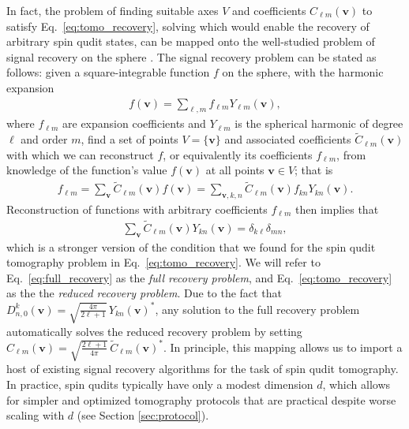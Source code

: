 \documentclass[notitlepage,twocolumn]{revtex4-2}
\newcommand{\p}[1]{\left(#1\right)} %
\renewcommand{\v}{\bm} %
\renewcommand{\set}[1]{\{#1\}} %
\begin{document}
In fact, the problem of finding suitable axes $V$ and coefficients $C_{\ell m}\p{\v v}$ to satisfy Eq.~\eqref{eq:tomo_recovery}, solving which would enable the recovery of arbitrary spin qudit states, can be mapped onto the well-studied problem of signal recovery on the sphere \cite{mcewen2011novel, rauhut2011sparse, alem2012sparse, khalid2014optimaldimensionality}.
The signal recovery problem can be stated as follows: given a square-integrable function $f$ on the sphere, with the harmonic expansion
\begin{align}
  f\p{\v v} = \sum_{\ell,m} f_{\ell m} Y_{\ell m}\p{\v v},
\end{align}
where $f_{\ell m}$ are expansion coefficients and $Y_{\ell m}$ is the spherical harmonic of degree $\ell$ and order $m$, find a set of points $V=\set{\v v}$ and associated coefficients $\tilde C_{\ell m}\p{\v v}$ with which we can reconstruct $f$, or equivalently its coefficients $f_{\ell m}$, from knowledge of the function's value $f\p{\v v}$ at all points $\v v\in V$; that is
\begin{align}
  f_{\ell m} = \sum_{\v v} \tilde C_{\ell m}\p{\v v} f\p{\v v}
  = \sum_{\v v,k,n} \tilde C_{\ell m}\p{\v v} f_{kn} Y_{kn}\p{\v v}.
\end{align}
Reconstruction of functions with arbitrary coefficients $f_{\ell m}$ then implies that
\begin{align}
  \sum_{\v v} \tilde C_{\ell m}\p{\v v} Y_{kn}\p{\v v}
  = \delta_{k\ell} \delta_{mn},
  \label{eq:full_recovery}
\end{align}
which is a stronger version of the condition that we found for the spin qudit tomography problem in Eq.~\eqref{eq:tomo_recovery}.
We will refer to Eq.~\eqref{eq:full_recovery} as the {\it full recovery problem}, and Eq.~\eqref{eq:tomo_recovery} as the the {\it reduced recovery problem}.
Due to the fact that $D^k_{n,0}\p{\v v} = \sqrt{\frac{4\pi}{2\ell+1}}\, Y_{kn}\p{\v v}^*$, any solution to the full recovery problem automatically solves the reduced recovery problem by setting $C_{\ell m}\p{\v v} = \sqrt{\frac{2\ell+1}{4\pi}}\, \tilde C_{\ell m}\p{\v v}^*$.
In principle, this mapping allows us to import a host of existing signal recovery algorithms \cite{mcewen2011novel, rauhut2011sparse, alem2012sparse, khalid2014optimaldimensionality} for the task of spin qudit tomography.
In practice, spin qudits typically have only a modest dimension $d$, which allows for simpler and optimized tomography protocols that are practical despite worse scaling with $d$ (see Section \ref{sec:protocol}).
\end{document}
